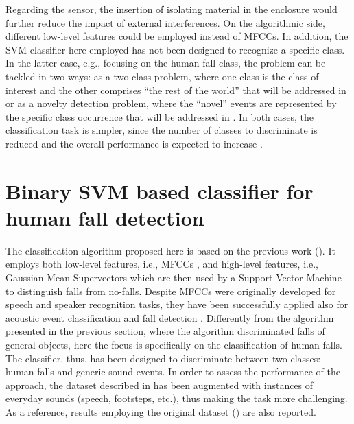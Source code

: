 Regarding the sensor, the insertion of isolating material in the enclosure would further reduce the impact of external interferences. On the algorithmic side, different low-level features could be employed instead of MFCCs. 
 In addition, the SVM classifier here employed has not been designed to recognize a specific class. In the latter case, e.g., focusing on the human fall class, the problem can be tackled in two ways: as a two class problem, where one class is the class of interest and the other comprises ``the rest of the world'' that will be addressed in  or as a novelty detection problem, where the ``novel'' events are represented by the specific class occurrence that will be addressed in . In both cases, the classification task is simpler, since the number of classes to discriminate is reduced and the overall performance is expected to increase \cite{bishop06}.

\section{Binary SVM based classifier for human fall detection}
\label{sec:biclass_svm}

The classification algorithm proposed here is based on the previous work (). It employs both low-level features, i.e., MFCCs \cite{Davis80}, and high-level features, i.e., Gaussian Mean Supervectors which are then used by a Support Vector Machine to distinguish falls from no-falls. Despite MFCCs were originally developed for speech and speaker recognition tasks, they have been successfully applied also for acoustic event classification \cite{Temko06} and fall detection \cite{zigel2009method}. Differently from the algorithm presented in the previous section, where the algorithm discriminated falls of general objects, here the focus is specifically on the classification of human falls. The classifier, thus, has been designed to discriminate between two classes: human falls and generic sound events. In order to assess the performance of the approach, the dataset described in  has been augmented with instances of everyday sounds (speech, footsteps, etc.), thus making the task more challenging. As a reference, results employing the original dataset () are also reported.

